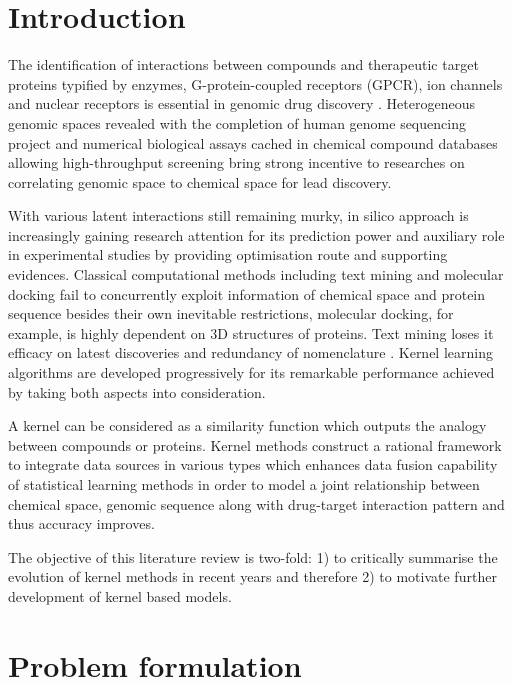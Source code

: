 \documentclass[a4paper,12pt]{report}
\begin{document}
\chapter{Introduction}

The identification of interactions between compounds and therapeutic target proteins typified by enzymes, G-protein-coupled receptors (GPCR), ion channels and nuclear receptors is essential in genomic drug discovery \citep{and02}. Heterogeneous genomic spaces revealed with the completion of human genome sequencing project and numerical biological assays cached in chemical compound databases allowing high-throughput screening bring strong incentive to researches on correlating genomic space to chemical space for lead discovery. 

With various latent interactions still remaining murky, in silico approach is increasingly gaining research attention for its prediction power and auxiliary role in experimental studies by providing optimisation route and supporting evidences. Classical computational methods including text mining and molecular docking fail to concurrently exploit information of chemical space and protein sequence besides their own inevitable restrictions, molecular docking, for example, is highly dependent on 3D structures of proteins. Text mining loses it efficacy on latest discoveries and redundancy of nomenclature \citep{zhu05}.  Kernel learning algorithms are developed progressively for its remarkable performance achieved by taking both aspects into consideration.

A kernel can be considered as a similarity function which outputs the analogy between compounds or proteins. Kernel methods construct a rational framework to integrate data sources in various types which enhances data fusion capability of statistical learning methods in order to model a joint relationship between chemical space, genomic sequence along with drug-target interaction pattern and thus accuracy improves. 

The objective of this literature review is two-fold: 1) to critically summarise the evolution of kernel methods in recent years and therefore 2) to motivate further development of kernel based models.

\chapter{Problem formulation}
\end{document}
